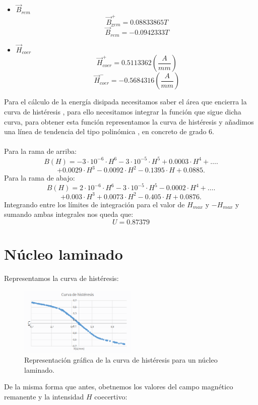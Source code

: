 \documentclass[11pt,letterpaper,twocolumn]{article}
\begin{document}
\begin{itemize}
	\item \textbf{$\vec{B}_{rem}$}
\begin{equation}	
	\boxed{\vec{B}^+_{rem}=0.08833865 T}
\end{equation}
\begin{equation}
	\boxed{\vec{B}^-_{rem}=-0.0942333 T}
\end{equation}

\item $\vec{H}_{coer}$
	 \begin{equation}
		 \boxed{\vec{H}^+_{coer}=0.5113362 \left( \frac{A}{mm} \right) }
	 \end{equation}
	 \begin{equation}
		 \boxed{\vec{H}^-_{coer}=-0.5684316 \left( \frac{A}{mm} \right) }
	 \end{equation}
\end{itemize}
Para el cálculo de la energía disipada necesitamos saber el área que encierra la curva de histéresis , para ello necesitamos integrar la función que sigue dicha curva, para obtener esta función representamos la curva de histéresis y añadimos una línea de tendencia del tipo polinómica , en concreto de grado 6. \\
\\
Para la rama de arriba:
\[
B(H)=-3\cdot 10^{-6}\cdot H^6 - 3\cdot 10^{-5}\cdot H^5 + 0.0003\cdot H^4 +\ldots .
\]
\[
	+ 0.0029\cdot H^3 -0.0092\cdot H^2-0.1395\cdot H+0.0885
.\] 
Para la rama de abajo:
\[
	B(H)=2\cdot 10^{-6}\cdot H^6 - 3\cdot 10^{-5}\cdot H^5 - 0.0002\cdot H^4+ \ldots	
.\] 
\[
	+ 0.003\cdot H^3 +0.0073\cdot H^2-0.405\cdot H+0.0876
.\] 
Integrando entre los límites de integración para el valor de $H_{max}$ y  $-H_{max}$ y sumando ambas integrales nos queda que:
\begin{equation}
	\boxed{U=0.87379}
\end{equation}

\section{Núcleo laminado}%
\label{se}
Representamos la curva de histéresis:
\begin{figure}[H]
	\centering
	\includegraphics[width=0.5\textwidth]{imagen/laminado.png}
	\caption{Representación gráfica de la curva de histéresis para un núcleo laminado.}
	\label{fig:imagen-laminado-png}
\end{figure}
De la misma forma que antes, obetnemos los valores del campo magnético remanente y la intensidad $H$ coecertivo:
\end{document}
